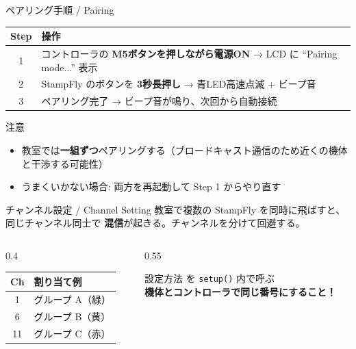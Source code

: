 \documentclass[aspectratio=169, 14pt]{beamer}
\begin{document}
\begin{frame}{ペアリング手順 / Pairing}
  \begin{table}
    \centering
    \begin{tabular}{cp{120mm}}
      \hline
      \textbf{Step} & \textbf{操作} \\
      \hline
      1 & コントローラの \textbf{M5ボタンを押しながら電源ON} → LCD に ``Pairing mode...'' 表示 \\
      2 & StampFly のボタンを \textbf{3秒長押し} → 青LED高速点滅 + ビープ音 \\
      3 & ペアリング完了 → ビープ音が鳴り、次回から自動接続 \\
      \hline
    \end{tabular}
  \end{table}

  \begin{alertblock}{注意}
    \begin{itemize}
      \item 教室では\textbf{一組ずつ}ペアリングする（ブロードキャスト通信のため近くの機体と干渉する可能性）
      \item うまくいかない場合: 両方を再起動して Step 1 からやり直す
    \end{itemize}
  \end{alertblock}
\end{frame}

\begin{frame}{チャンネル設定 / Channel Setting}
  教室で複数の StampFly を同時に飛ばすと、同じチャンネル同士で
  \textbf{混信}が起きる。チャンネルを分けて回避する。

  \vspace{0.5em}

  \begin{columns}[c]
    \begin{column}{0.4\textwidth}
      \centering
      \begin{tabular}{cl}
        \hline
        \textbf{Ch} & \textbf{割り当て例} \\
        \hline
        1  & \textcolor{green!70!black}{グループ A（緑）} \\
        6  & \textcolor{yellow!80!black}{グループ B（黄）} \\
        11 & \textcolor{red!80!black}{グループ C（赤）} \\
        \hline
      \end{tabular}
    \end{column}
    \begin{column}{0.55\textwidth}
      \begin{alertblock}{設定方法}
         を \texttt{setup()} 内で呼ぶ\\
        \textbf{機体とコントローラで同じ番号にすること！}
      \end{alertblock}
    \end{column}
  \end{columns}
\end{frame}
\end{document}
